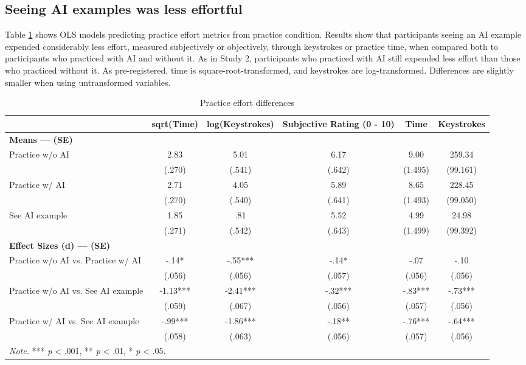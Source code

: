 \documentclass[11pt]{report}
\begin{document}
\begin{append}
\begin{landscape}
\begin{table}[h]
    \label{tab:s3_test}
\end{table}

\end{landscape}

\FloatBarrier
\subsection{Seeing AI examples was less effortful}
Table \ref{tab:effort_practice3} shows OLS models predicting practice effort metrics from practice condition. Results show that participants seeing an AI example expended considerably less effort, measured subjectively or objectively, through keystrokes or practice time, when compared both to participants who practiced with AI and without it. As in Study 2, participants who practiced with AI still expended less effort than those who practiced without it. As pre-registered, time is square-root-transformed, and keystrokes are log-transformed. Differences are slightly smaller when using untransformed variables.


\begin{table}[h]
    \centering
        \caption{Practice effort differences}
\footnotesize
\begin{tabular}{lccccc}
\toprule
  & sqrt(Time) & log(Keystrokes) & Subjective Rating (0 - 10) & Time & Keystrokes \\ 
\midrule
\multicolumn{6}{l}{\textbf{Means --- (SE)}} \\ 
\midrule
Practice w/o AI & 2.83 & 5.01 & 6.17 & 9.00 & 259.34 \\ 
 & (.270) & (.541) & (.642) & (1.495) & (99.161) \\ 
Practice w/ AI & 2.71 & 4.05 & 5.89 & 8.65 & 228.45 \\ 
 & (.270) & (.540) & (.641) & (1.493) & (99.050) \\ 
See AI example & 1.85 & .81 & 5.52 & 4.99 & 24.98 \\ 
 & (.271) & (.542) & (.643) & (1.499) & (99.392) \\ 
\midrule
\multicolumn{6}{l}{\textbf{Effect Sizes (d) --- (SE)}} \\ 
\midrule
Practice w/o AI vs. Practice w/ AI & -.14* & -.55*** & -.14* & -.07 & -.10 \\ 
 & (.056) & (.056) & (.057) & (.056) & (.056) \\ 
Practice w/o AI vs. See AI example & -1.13*** & -2.41*** & -.32*** & -.83*** & -.73*** \\ 
 & (.059) & (.067) & (.056) & (.057) & (.056) \\ 
Practice w/ AI vs. See AI example & -.99*** & -1.86*** & -.18** & -.76*** & -.64*** \\ 
 & (.058) & (.063) & (.056) & (.057) & (.056) \\ 
\midrule
\multicolumn{6}{l}{\textit{Note.} *** \textit{p} < .001, ** \textit{p} < .01, * \textit{p} < .05.}
\vspace{5pt}
\end{tabular}
    \label{tab:effort_practice3}
\end{table}



\end{append}
\end{document}
